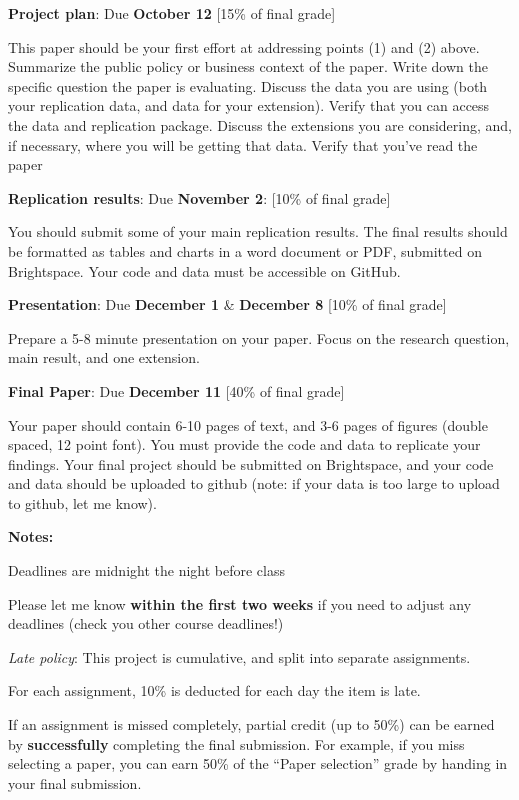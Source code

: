 \documentclass[11 pt]{article}
\begin{document}
\textbf{Project plan}: Due \textbf{October 12} [15\% of final grade] 
\begin{blist}
\item This paper should be your first effort at addressing points (1) and (2) above.
Summarize the public policy or business context of the paper. Write down the
specific question the paper is evaluating. Discuss the data you are using (both your replication data, and data for your extension). Verify that you can access the data and replication package. Discuss the extensions you are considering, and, if necessary, where you will be getting that data. Verify that you’ve read the paper
\end{blist} 

\textbf{Replication results}: Due \textbf{November 2}: [10\% of final grade]
\begin{blist}
\item You should submit some of your main replication results. The final results should be formatted as tables and charts in a word document or PDF, submitted on Brightspace. Your code and data must be accessible on GitHub.
\end{blist}

\textbf{Presentation}: Due \textbf{December 1} \& \textbf{December 8} [10\% of final grade]
\begin{blist}
\item Prepare a 5-8 minute presentation on your paper. Focus on the research question, main result, and one extension. 
\end{blist}

\textbf{Final Paper}: Due \textbf{December 11} [40\% of final grade]
\begin{blist}
\item Your paper should contain 6-10 pages of text, and 3-6 pages of figures (double spaced, 12 point font).
You must provide the code and data to replicate your findings. 
Your final project should be submitted on Brightspace, and your code and data should be uploaded to github (note: if your data is too large to upload to github, let me know). 
\end{blist}

\textbf{Notes:}
\begin{blist}
    \item Deadlines are midnight the night before class
    \item Please let me know \textbf{within the first two weeks} if you need to adjust any deadlines (check you other course deadlines!)
    \item \emph{Late policy}: This project is cumulative, and split into separate assignments. 
    \begin{blist}
    \item For each assignment, 10\% is deducted for each day the item is late.
    \item If an assignment is missed completely, partial credit (up to 50\%) can be earned by \textbf{successfully} completing the final submission. For example, if you miss selecting a paper, you can earn 50\% of the ``Paper selection'' grade by handing in your final submission.
    \end{blist} 
\end{blist}
\end{document}
